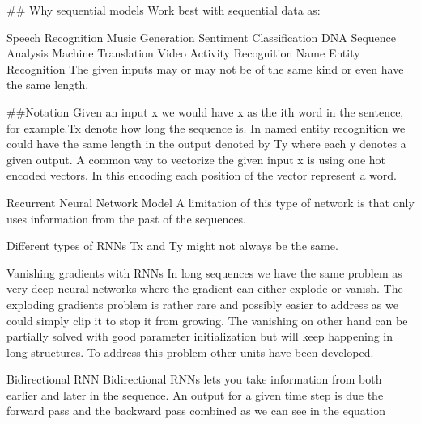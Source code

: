 ## Why sequential models
Work best with sequential data as:

Speech Recognition Music Generation Sentiment Classification DNA Sequence Analysis Machine Translation Video Activity Recognition Name Entity Recognition The given inputs may or may not be of the same kind or even have the same length.

   ##Notation
Given an input x we would have x as the ith word in the sentence, for example.Tx denote how long the sequence is. In named entity recognition we could have the same length in the output denoted by Ty where each y denotes a given output. A common way to vectorize the given input x is using one hot encoded vectors. In this encoding each position of the vector represent a word.

Recurrent Neural Network Model
A limitation of this type of network is that only uses information from the past of the sequences.

Different types of RNNs Tx and Ty might not always be the same.

Vanishing gradients with RNNs
In long sequences we have the same problem as very deep neural networks where the gradient can either explode or vanish. The exploding gradients problem is rather rare and possibly easier to address as we could simply clip it to stop it from growing. The vanishing on other hand can be partially solved with good parameter initialization but will keep happening in long structures. To address this problem other units have been developed.

Bidirectional RNN
Bidirectional RNNs lets you take information from both earlier and later in the sequence. An output for a given time step is due the forward pass and the backward pass combined as we can see in the equation